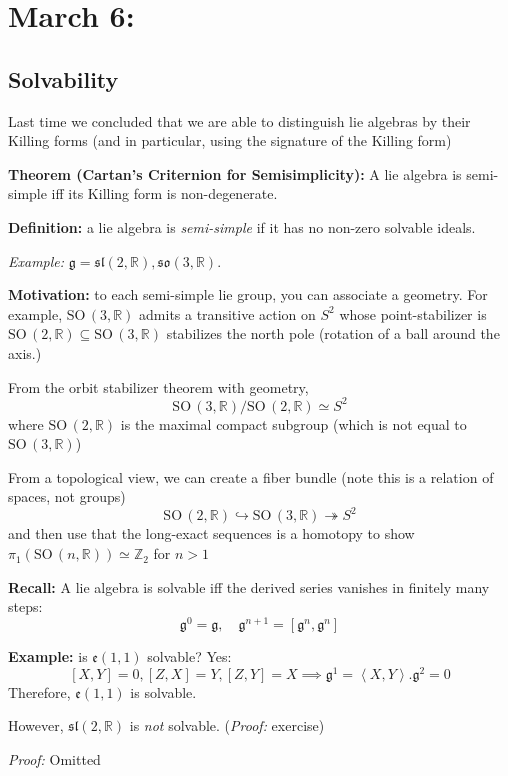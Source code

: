 \documentclass[12pt]{article}
\newcommand{\R}{\mathbb{R}}
\newcommand{\Z}{\mathbb{Z}}
\newcommand{\brak}[1]{\left\langle #1 \right\rangle}
\newcommand{\SO}{\text{SO}\,}
\newcommand{\g}{\mathfrak{g}}
\newcommand{\h}{\mathfrak{h}}
\newcommand{\slf}{\mathfrak{sl}}
\newenvironment*{tbox}[2][gray]{
    \begin{tcolorbox}[
        parbox=false,
        colback=#1!5!white,
        colframe=#1!75!black,
        breakable,
        title={#2}
    ]}
    {\end{tcolorbox}}
\begin{document}
\section{March 6:}
\subsection*{Solvability}
    Last time we concluded that we are able to distinguish lie algebras by their Killing forms (and in particular, using the signature of the Killing form)

    \textbf{Theorem (Cartan's Criternion for Semisimplicity):} A lie algebra is semi-simple iff its Killing form is non-degenerate.
    
    \textbf{Definition:} a lie algebra is \emph{semi-simple} if it has no non-zero solvable ideals.

    \emph{Example:} $\g = \slf(2, \R), \mathfrak{so}(3, \R)$.
    
    \textbf{Motivation:} to each semi-simple lie group, you can associate a geometry. For example, $\SO(3, \R)$ admits a transitive action on $S^2$ whose point-stabilizer is $\SO(2, \R) \subseteq \SO(3, \R)$ stabilizes the north pole (rotation of a ball around the axis.) 

    From the orbit stabilizer theorem with geometry, 
    \[\SO(3, \R)/\SO(2, \R) \simeq S^2\]
    where $\SO(2, \R)$ is the maximal compact subgroup (which is not equal to $\SO(3, \R)$)

    From a topological view, we can create a fiber bundle (note this is a relation of spaces, not groups)
    \[\SO(2, \R) \hookrightarrow \SO(3, \R) \twoheadrightarrow S^2\]
    and then use that the long-exact sequences is a homotopy to show $\pi_1(\SO(n, \R)) \simeq \Z_2$ for $n > 1$ 

    \textbf{Recall:} A lie algebra is solvable iff the derived series vanishes in finitely many steps: 
    \[\g^0 = \g, \quad \g^{n+1} = [\g^n, \g^n]\]

    \textbf{Example:} is $\mathfrak{e}(1, 1)$ solvable? Yes:
    \[[X, Y] = 0, [Z, X] = Y, [Z, Y] = X \implies \g^1 = \brak{X, Y}. \g^2 = 0\] 
    Therefore, $\mathfrak{e}(1, 1)$ is solvable.

    However, $\slf(2, \R)$ is \emph{not} solvable. (\emph{Proof:} exercise) 

    \begin{tbox}{\textbf{Theorem (Levi decomposition):} Every finite dimensional lie algebra fits into a short exact sequence 
        \[\h \hookrightarrow \g \twoheadrightarrow \g/\h\]
        where $\h$ is the unique maximal solvable ideal and $\g/\h$ is semi-simple. Further, this sequence is split. (Though this is much harder to show)}
        \emph{Proof:} Omitted 
    \end{tbox}
\end{document}
